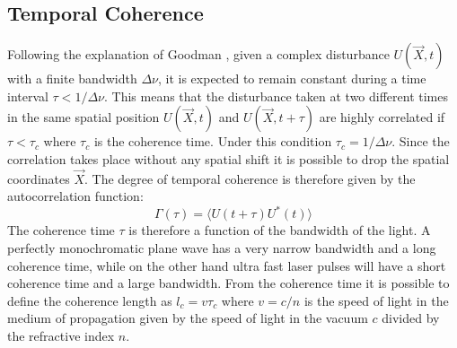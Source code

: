\subsection{Temporal Coherence}
\label{sec:temp}
Following the explanation of Goodman \cite{goodman2015statistical}, given a complex disturbance $U(\overrightarrow{X},t)$ with a finite bandwidth $\Delta\nu $, it is expected to remain constant during a time interval $\tau<1/\Delta\nu$. This means that the disturbance taken at two different times in the same spatial position $U(\overrightarrow{X},t)$ and $U(\overrightarrow{X},t+\tau)$ are highly correlated if $\tau<\tau_c$ where $\tau_c$ is the coherence time. Under this condition $\tau_c=1/\Delta\nu$.
Since the correlation takes place without any spatial shift it is possible to drop the spatial coordinates $\overrightarrow{X}$. The degree of temporal coherence is therefore given by the autocorrelation function:
\begin{equation}
\label{eq:coherence1}
	\Gamma(\tau) =\langle U(t+\tau)U^*(t) \rangle
\end{equation}
The coherence time $\tau$ is therefore a function of the bandwidth of the light. A perfectly monochromatic plane wave has a very narrow bandwidth and a long coherence time, while on the other hand ultra fast laser pulses will have a short coherence time and a large bandwidth. From the coherence time it is possible to define the coherence length as $l_c= v\tau_c$ where $v=c/n$ is the speed of light in the medium of propagation given by the speed of light in the vacuum $c$ divided by the refractive index $n$.

